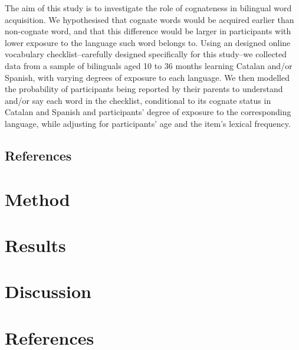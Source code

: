 \documentclass[
  english,
  man,man,floatsintext]{apa6}
\begin{document}
The aim of this study is to investigate the role of cognateness in bilingual word acquisition. We hypothesised that cognate words would be acquired earlier than non-cognate word, and that this difference would be larger in participants with lower exposure to the language such word belongs to. Using an designed online vocabulary checklist--carefully designed specifically for this study--we collected data from a sample of bilinguals aged 10 to 36 months learning Catalan and/or Spanish, with varying degrees of exposure to each language. We then modelled the probability of participants being reported by their parents to understand and/or say each word in the checklist, conditional to its cognate status in Catalan and Spanish and participants' degree of exposure to the corresponding language, while adjusting for participants' age and the item's lexical frequency.

\hypertarget{references}{%
\subsection{References}\label{references}}

\hypertarget{method}{%
\section{Method}\label{method}}

\hypertarget{results}{%
\section{Results}\label{results}}

\hypertarget{discussion}{%
\section{Discussion}\label{discussion}}

\hypertarget{references-1}{%
\section{References}\label{references-1}}

\begingroup
\setlength{\parindent}{-0.5in}
\setlength{\leftskip}{0.5in}
\end{document}
